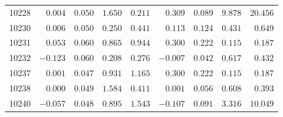 \documentclass[6pt]{article}
\begin{document}
\begin{landscape}
{\begin{longtable}{lrrrrrrrr}
10228&$ 0.004$&$0.050$&$1.650$&$0.211$&$ 0.309$&$0.089$&$    9.878$&$ 20.456$\tabularnewline
10230&$ 0.006$&$0.050$&$0.250$&$0.441$&$ 0.113$&$0.124$&$    0.431$&$  0.649$\tabularnewline
10231&$ 0.053$&$0.060$&$0.865$&$0.944$&$ 0.300$&$0.222$&$    0.115$&$  0.187$\tabularnewline
10232&$-0.123$&$0.060$&$0.208$&$0.276$&$-0.007$&$0.042$&$    0.617$&$  0.432$\tabularnewline
10237&$ 0.001$&$0.047$&$0.931$&$1.165$&$ 0.300$&$0.222$&$    0.115$&$  0.187$\tabularnewline
10238&$ 0.000$&$0.049$&$1.584$&$0.411$&$ 0.001$&$0.056$&$    0.608$&$  0.393$\tabularnewline
10240&$-0.057$&$0.048$&$0.895$&$1.543$&$-0.107$&$0.091$&$    3.316$&$ 10.049$\tabularnewline
\hline
\end{longtable}}\end{landscape}
\end{document}
